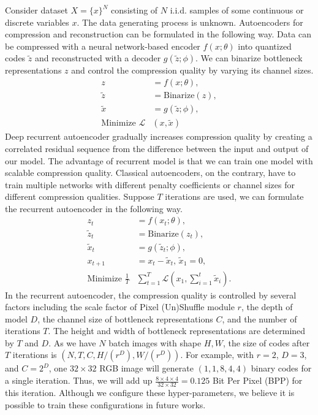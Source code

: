 \documentclass[10pt,twocolumn,letterpaper]{article}
\begin{document}
Consider dataset $X = \{x\}^{N}$ consisting of $N$ i.i.d. samples of some continuous or discrete variables $x$. The data generating process is unknown. Autoencoders for compression and reconstruction can be formulated in the following way. Data can be compressed with a neural network-based encoder $f(x;\theta)$ into quantized codes $\tilde{z}$ and reconstructed with a decoder $g(\tilde{z};\phi)$. We can binarize bottleneck representations $z$ and control the compression quality by varying its channel sizes.
\begin{align}
z &= f(x;\theta),\\
\tilde{z} &= \text{Binarize}(z),\\
\tilde{x} &= g(\tilde{z};\phi),\\
\text{Minimize } \mathcal{L}&(x,\tilde{x})
\end{align}
Deep recurrent autoencoder gradually increases compression quality by creating a correlated residual sequence from the difference between the input and output of our model. The advantage of recurrent model is that we can train one model with scalable compression quality. Classical autoencoders, on the contrary, have to train multiple networks with different penalty coefficients or channel sizes for different compression qualities. Suppose $T$ iterations are used, we can formulate the recurrent autoencoder in the following way.
\begin{align}
z_t &= f(x_t;\theta),\\
\tilde{z}_t &= \text{Binarize}(z_t),\\
\tilde{x}_t &= g(\tilde{z}_t;\phi),\\
x_{t+1} &= x_t-\tilde{x}_t\text{, }\tilde{x}_1=0,\\
\text{Minimize } \frac{1}{T}&\sum_{t=1}^{T}\mathcal{L}(x_1,\sum_{i=1}^{t}\tilde{x}_i).
\end{align}
In the recurrent autoencoder, the compression quality is controlled by several factors including the scale factor of Pixel (Un)Shuffle module $r$, the depth of model $D$, the channel size of bottleneck representations $C$, and the number of iterations $T$. The height and width of bottleneck representations are determined by $T$ and $D$. As we have $N$ batch images with shape $H,W$, the size of codes after $T$ iterations is $(N,T,C,H/(r^D),W/(r^D))$. For example, with $r=2$, $D=3$, and $C=2^D$, one $32 \times 32$ RGB image will generate $(1,1,8,4,4)$ binary codes for a single iteration. Thus, we will add up $\frac{8
\times4\times4}{32\times32} = 0.125$ Bit Per Pixel (BPP) for this iteration. Although we configure these hyper-parameters, we believe it is possible to train these configurations in future works.
\end{document}
